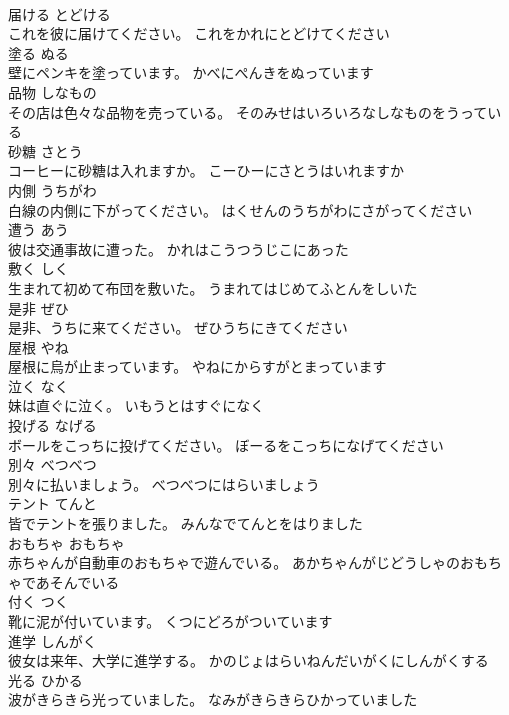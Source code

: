 \documentclass[8pt]{extreport}
\begin{document}
\begin{CJK}{UTF8}{min}
\\	届ける	とどける	
\\	これを彼に届けてください。	これをかれにとどけてください	
\\	塗る	ぬる	
\\	壁にペンキを塗っています。	かべにぺんきをぬっています	
\\	品物	しなもの	
\\	その店は色々な品物を売っている。	そのみせはいろいろなしなものをうっている	
\\	砂糖	さとう	
\\	コーヒーに砂糖は入れますか。	こーひーにさとうはいれますか	
\\	内側	うちがわ	
\\	白線の内側に下がってください。	はくせんのうちがわにさがってください	
\\	遭う	あう	
\\	彼は交通事故に遭った。	かれはこうつうじこにあった	
\\	敷く	しく	
\\	生まれて初めて布団を敷いた。	うまれてはじめてふとんをしいた	
\\	是非	ぜひ	
\\	是非、うちに来てください。	ぜひうちにきてください	
\\	屋根	やね	
\\	屋根に烏が止まっています。	やねにからすがとまっています	
\\	泣く	なく	
\\	妹は直ぐに泣く。	いもうとはすぐになく	
\\	投げる	なげる	
\\	ボールをこっちに投げてください。	ぼーるをこっちになげてください	
\\	別々	べつべつ	
\\	別々に払いましょう。	べつべつにはらいましょう	
\\	テント	てんと	
\\	皆でテントを張りました。	みんなでてんとをはりました	
\\	おもちゃ	おもちゃ	
\\	赤ちゃんが自動車のおもちゃで遊んでいる。	あかちゃんがじどうしゃのおもちゃであそんでいる	
\\	付く	つく	
\\	靴に泥が付いています。	くつにどろがついています	
\\	進学	しんがく	
\\	彼女は来年、大学に進学する。	かのじょはらいねんだいがくにしんがくする	
\\	光る	ひかる	
\\	波がきらきら光っていました。	なみがきらきらひかっていました	

\end{CJK}
\end{document}
